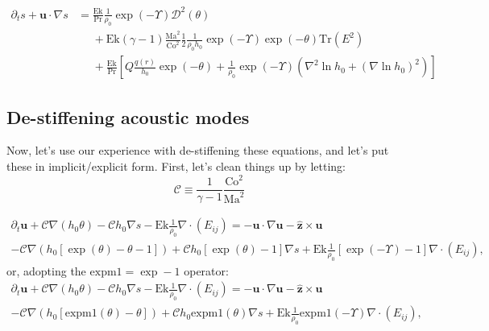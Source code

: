 \documentclass{aastex62}
\newcommand{\del}{\nabla}
\renewcommand{\vec}{\boldsymbol}
\newcommand{\scrC}{\mathcal{C}}
\newcommand{\scrD}{\mathcal{D}}
\newcommand{\expm}{\mathrm{expm1}}
\begin{document}
\begin{align}
  \partial_t s + \vec{u}\cdot \del s &=
  \frac{\mathrm{Ek}}{\mathrm{Pr}} \frac{1}{\rho_0} \exp(-\Upsilon)\scrD^2(\theta) \nonumber\\
  &\phantom{=}+ \mathrm{Ek} (\gamma-1)\frac{\mathrm{Ma}^{2}}{\mathrm{Co}^2} \frac{1}{2}\frac{1}{\rho_0 h_0}\exp(-\Upsilon) \exp(-\theta)\mathrm{Tr}(E^2)\nonumber\\
  &\phantom{=}+ \frac{\mathrm{Ek}}{\mathrm{Pr}}\left[Q \frac{q(r)}{h_0}\exp(-\theta) +  \frac{1}{\rho_0} \exp(-\Upsilon) \left(\nabla^2 \ln h_0 + (\nabla \ln h_0)^2 \right)\right]
\end{align}

\subsection{De-stiffening acoustic modes}
Now, let's use our experience with de-stiffening these equations, and let's put these in implicit/explicit form.  First, let's clean things up by letting:
\begin{equation}
  \scrC \equiv \frac{1}{\gamma-1}\frac{\mathrm{Co}^2}{\mathrm{Ma}^{2}}
\end{equation}

\begin{multline}
  \partial_t \vec{u}
  + \scrC \del (h_0 \theta)
  - \scrC h_0 \del s
  - \mathrm{Ek}\frac{1}{\rho_0}\del\cdot (E_{ij})
  =
  - \vec{u}\cdot \del \vec{u} - \vec{\hat{z}} \times \vec{u} \\
  - \scrC \del (h_0[\exp(\theta)-\theta - 1])
  + \scrC h_0\left[\exp(\theta)-1\right]\del s
  + \mathrm{Ek}\frac{1}{\rho_0}\left[\exp(-\Upsilon)-1\right]\del\cdot (E_{ij}),
\end{multline}
or, adopting the $\expm = \exp - 1$ operator:
\begin{multline}
  \partial_t \vec{u}
  + \scrC \del (h_0 \theta)
  - \scrC h_0 \del s
  - \mathrm{Ek}\frac{1}{\rho_0}\del\cdot (E_{ij})
  =
  - \vec{u}\cdot \del \vec{u} - \vec{\hat{z}} \times \vec{u} \\
  - \scrC \del (h_0[\expm(\theta)-\theta])
  + \scrC h_0 \expm(\theta)\del s
  + \mathrm{Ek}\frac{1}{\rho_0}\expm(-\Upsilon) \del\cdot (E_{ij}),
\end{multline}
\end{document}
